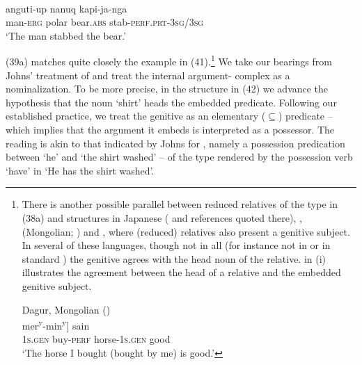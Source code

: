 \documentclass[output=paper]{langsci/langscibook}
\begin{document}
\ea%
          \citep[61]{Johns1992}\label{ex:manzini:41}\\
    \gll anguti-up   nanuq     kapi-ja-nga\\
         man-\textsc{erg}   {polar bear.\textsc{abs}}  stab-\textsc{perf.prt-3sg/3sg}\\
    \glt ‘The man stabbed the bear.’
\z

 (39a) matches quite closely the  example in (41).\footnote{There is another possible parallel between reduced relatives of the type in (38a) and structures in Japanese (\citealt{Miyagawa2011} and references quoted there),  \citep{Kornfilt2008},  (Mongolian; \citealt{Hale2002}) and  \citep{Herd2011}, where (reduced) relatives also present a genitive subject. In several of these languages, though not in all (for instance not in  or in standard ) the genitive agrees with the head noun of the relative.  in (i) illustrates the agreement between the head of a relative and the embedded genitive subject.

\ea         Dagur, Mongolian (\citealt[109-110]{Hale2002})\\
    \gll    [[mini   au-sen]         
            mer\textsuperscript{y}{}-min\textsuperscript{y}]   sain\\   \textsc{1s.gen}  buy-\textsc{perf}  horse-\textsc{1s.gen}  good\\
    \glt    ‘The horse I bought (bought by me) is good.’
\z
}  We take our bearings from Johns’ treatment of  and treat the internal argument- complex as a nominalization. To be more precise, in the structure in (42) we advance the hypothesis that the noun ‘shirt’ heads the embedded predicate. Following our established practice, we treat the genitive as an elementary ($\subseteq$) predicate – which implies that the argument it embeds is interpreted as a possessor. The reading is akin to that indicated by Johns for , namely a possession predication between ‘he’ and ‘the shirt washed’ – of the type rendered by the possession verb ‘have’ in  ‘He has the shirt washed’.  
\end{document}
